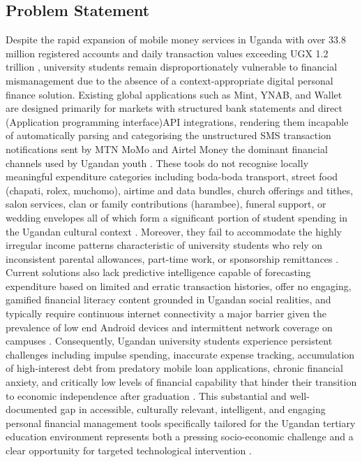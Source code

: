 \documentclass[12pt]{article}
\begin{document}
\subsection{\large Problem Statement}
Despite the rapid expansion of mobile money services in Uganda with over 33.8 million registered accounts and daily transaction values exceeding UGX 1.2 trillion \citep{bou2024}, university students remain disproportionately vulnerable to financial mismanagement due to the absence of a context-appropriate digital personal finance solution. Existing global applications such as Mint, YNAB, and Wallet are designed primarily for markets with structured bank statements and direct (Application programming interface)API integrations, rendering them incapable of automatically parsing and categorising the unstructured SMS transaction notifications sent by MTN MoMo and Airtel Money  the dominant financial channels used by Ugandan youth \citep{bou2024}. These tools do not recognise locally meaningful expenditure categories including boda-boda transport, street food (chapati, rolex, muchomo), airtime and data bundles, church offerings and tithes, salon services, clan or family contributions (harambee), funeral support, or wedding envelopes all of which form a significant portion of student spending in the Ugandan cultural context \citep{amana2024}. 
Moreover, they fail to accommodate the highly irregular income patterns characteristic of university students who rely on inconsistent parental allowances, part-time work, or sponsorship remittances \citep{mofped2023}. Current solutions also lack predictive intelligence capable of forecasting expenditure based on limited and erratic transaction histories, offer no engaging, gamified financial literacy content grounded in Ugandan social realities, and typically require continuous internet connectivity a major barrier given the prevalence of low end Android devices and intermittent network coverage on campuses \citep{ubos2024}. Consequently, Ugandan university students experience persistent challenges including impulse spending, inaccurate expense tracking, accumulation of high-interest debt from predatory mobile loan applications, chronic financial anxiety, and critically low levels of financial capability that hinder their transition to economic independence after graduation \citep{mofped2023,amana2024}. This substantial and well-documented gap in accessible, culturally relevant, intelligent, and engaging personal financial management tools specifically tailored for the Ugandan tertiary education environment represents both a pressing socio-economic challenge and a clear opportunity for targeted technological intervention \citep{mursi2024,imawan2025}.
\end{document}
